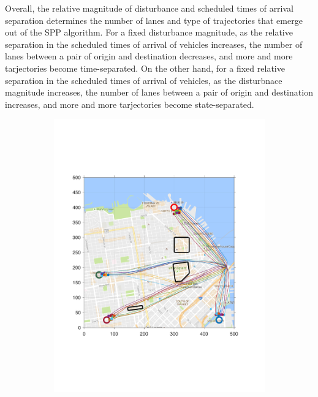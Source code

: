 Overall, the relative magnitude of disturbance and scheduled times of arrival separation determines the number of lanes and type of trajectories that emerge out of the SPP algorithm. For a fixed disturbance magnitude, as the relative separation in the scheduled times of arrival of vehicles increases, the number of lanes between a pair of origin and destination decreases, and more and more tarjectories become time-separated. On the other hand, for a fixed relative separation in the scheduled times of arrival of vehicles, as the disturbnace magnitude increases, the number of lanes between a pair of origin and destination increases, and more and more tarjectories become state-separated.
%
\begin{figure}[!htb]
 \centering
\begin{subfigure}{0.5\columnwidth}
  \includegraphics[width=\columnwidth]{figs/sf_d6sep0}
  \label{fig:sf_d6sep0}
\end{subfigure}%
\begin{subfigure}{0.5\columnwidth}

\end{subfigure}
\end{figure}
